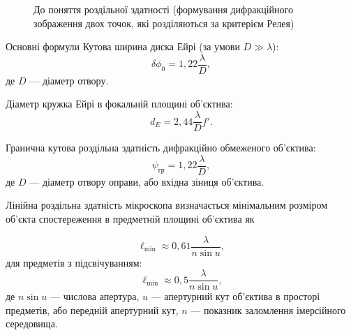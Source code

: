 \begin{figure}[h!]\centering
    
    \caption{До поняття роздільної здатності (формування дифракційного зображення двох точок, які розділяються за критерієм Релея)}
    \label{pic:lupa_resolution}
\end{figure}


\begin{Theory}{Основні формули}
    Кутова ширина диска Ейрі (за умови $D \gg \lambda$):
    \begin{equation}\label{eq:delta_phi_0}
        \delta\phi_0 = 1,22\frac{\lambda}{D},
    \end{equation}
    де $D$ --- діаметр отвору.

    Діаметр кружка Ейрі в фокальній площині об'єктива:
    \begin{equation}\label{eq:Eiri_diameter}
        d_E = 2,44\frac{\lambda}{D}f'.
    \end{equation}

    Гранична кутова роздільна здатність дифракційно обмеженого об'єктива:
    \begin{equation}\label{eq:psi_b}
        \psi_\text{гр} = 1,22\frac{\lambda}{D},
    \end{equation}
    де $D$ --- діаметр отвору оправи, або вхідна зіниця об'єктива.

    Лінійна роздільна здатність мікроскопа визначається мінімальним розміром об'єкта спостереження в предметній площині об'єктива як

    \begin{equation}\label{eq:l_min}
        \ell_{\min} \approx 0,61 \frac{\lambda}{n\sin u},
    \end{equation}
    для предметів з підсвічуванням:
    \begin{equation}\label{eq:l_min_immers}
        \ell_{\min} \approx 0,5 \frac{\lambda}{n\sin u},
    \end{equation}
    де $n\sin u$ ---  числова апертура, $ u $ --- апертурний кут об'єктива в просторі предметів, або передній апертурний кут, $ n $ --- показник заломлення імерсійного середовища.

%
\end{Theory}
